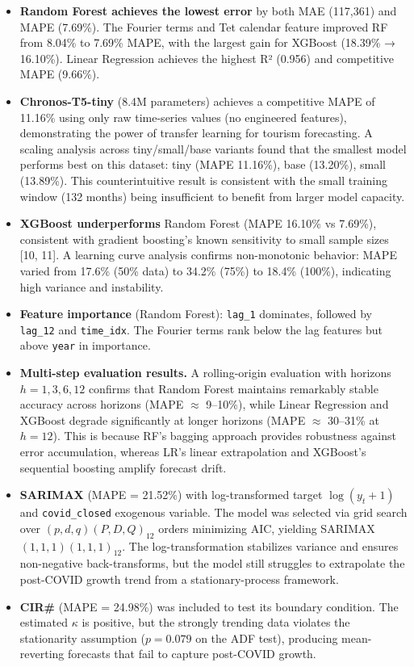 \documentclass[
]{article}
\begin{document}
\begin{itemize}
\item
  \textbf{Random Forest achieves the lowest error} by both MAE (117,361)
  and MAPE (7.69\%). The Fourier terms and Tet calendar feature improved
  RF from 8.04\% to 7.69\% MAPE, with the largest gain for XGBoost
  (18.39\% → 16.10\%). Linear Regression achieves the highest R² (0.956)
  and competitive MAPE (9.66\%).
\item
  \textbf{Chronos-T5-tiny} (8.4M parameters) achieves a competitive MAPE
  of 11.16\% using only raw time-series values (no engineered features),
  demonstrating the power of transfer learning for tourism forecasting.
  A scaling analysis across tiny/small/base variants found that the
  smallest model performs best on this dataset: tiny (MAPE 11.16\%),
  base (13.20\%), small (13.89\%). This counterintuitive result is
  consistent with the small training window (132 months) being
  insufficient to benefit from larger model capacity.
\item
  \textbf{XGBoost underperforms} Random Forest (MAPE 16.10\% vs 7.69\%),
  consistent with gradient boosting's known sensitivity to small sample
  sizes {[}10, 11{]}. A learning curve analysis confirms non-monotonic
  behavior: MAPE varied from 17.6\% (50\% data) to 34.2\% (75\%) to
  18.4\% (100\%), indicating high variance and instability.
\item
  \textbf{Feature importance} (Random Forest): \texttt{lag\_1}
  dominates, followed by \texttt{lag\_12} and \texttt{time\_idx}. The
  Fourier terms rank below the lag features but above \texttt{year} in
  importance.
\item
  \textbf{Multi-step evaluation results.} A rolling-origin evaluation
  with horizons \(h = 1, 3, 6, 12\) confirms that Random Forest
  maintains remarkably stable accuracy across horizons (MAPE \(\approx\)
  9--10\%), while Linear Regression and XGBoost degrade significantly at
  longer horizons (MAPE \(\approx\) 30--31\% at \(h = 12\)). This is
  because RF's bagging approach provides robustness against error
  accumulation, whereas LR's linear extrapolation and XGBoost's
  sequential boosting amplify forecast drift.
\item
  \textbf{SARIMAX} (MAPE = 21.52\%) with log-transformed target
  \(\log(y_t+1)\) and \texttt{covid\_closed} exogenous variable. The
  model was selected via grid search over \((p,d,q)(P,D,Q)_{12}\) orders
  minimizing AIC, yielding SARIMAX\((1,1,1)(1,1,1)_{12}\). The
  log-transformation stabilizes variance and ensures non-negative
  back-transforms, but the model still struggles to extrapolate the
  post-COVID growth trend from a stationary-process framework.
\item
  \textbf{CIR\#} (MAPE = 24.98\%) was included to test its boundary
  condition. The estimated \(\kappa\) is positive, but the strongly
  trending data violates the stationarity assumption (\(p = 0.079\) on
  the ADF test), producing mean-reverting forecasts that fail to capture
  post-COVID growth.
\end{itemize}
\end{document}

